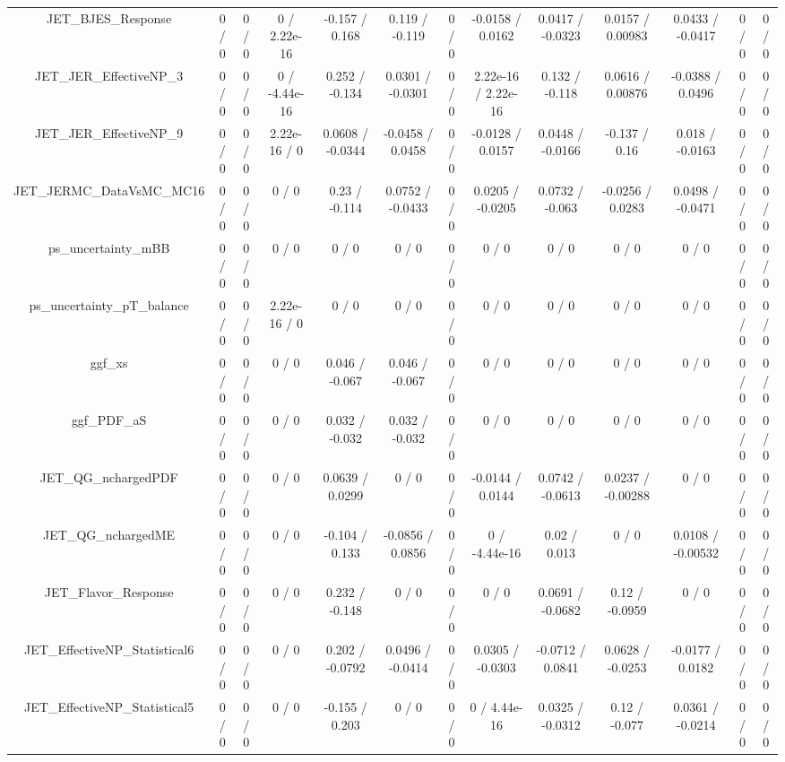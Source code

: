 \documentclass[10pt]{article}
\begin{document}
\begin{table}[htbp]
\begin{center}
\begin{tabular}{|c|c|c|c|c|c|c|c|c|c|c|c|c|}
  JET_BJES_Response & 0 / 0 & 0 / 0 & 0 / 2.22e-16 & -0.157 / 0.168 & 0.119 / -0.119 & 0 / 0 & -0.0158 / 0.0162 & 0.0417 / -0.0323 & 0.0157 / 0.00983 & 0.0433 / -0.0417 & 0 / 0 & 0 / 0 \\ 
  JET_JER_EffectiveNP_3 & 0 / 0 & 0 / 0 & 0 / -4.44e-16 & 0.252 / -0.134 & 0.0301 / -0.0301 & 0 / 0 & 2.22e-16 / 2.22e-16 & 0.132 / -0.118 & 0.0616 / 0.00876 & -0.0388 / 0.0496 & 0 / 0 & 0 / 0 \\ 
  JET_JER_EffectiveNP_9 & 0 / 0 & 0 / 0 & 2.22e-16 / 0 & 0.0608 / -0.0344 & -0.0458 / 0.0458 & 0 / 0 & -0.0128 / 0.0157 & 0.0448 / -0.0166 & -0.137 / 0.16 & 0.018 / -0.0163 & 0 / 0 & 0 / 0 \\ 
  JET_JERMC_DataVsMC_MC16 & 0 / 0 & 0 / 0 & 0 / 0 & 0.23 / -0.114 & 0.0752 / -0.0433 & 0 / 0 & 0.0205 / -0.0205 & 0.0732 / -0.063 & -0.0256 / 0.0283 & 0.0498 / -0.0471 & 0 / 0 & 0 / 0 \\ 
  ps_uncertainty_mBB & 0 / 0 & 0 / 0 & 0 / 0 & 0 / 0 & 0 / 0 & 0 / 0 & 0 / 0 & 0 / 0 & 0 / 0 & 0 / 0 & 0 / 0 & 0 / 0 \\ 
  ps_uncertainty_pT_balance & 0 / 0 & 0 / 0 & 2.22e-16 / 0 & 0 / 0 & 0 / 0 & 0 / 0 & 0 / 0 & 0 / 0 & 0 / 0 & 0 / 0 & 0 / 0 & 0 / 0 \\ 
  ggf_xs & 0 / 0 & 0 / 0 & 0 / 0 & 0.046 / -0.067 & 0.046 / -0.067 & 0 / 0 & 0 / 0 & 0 / 0 & 0 / 0 & 0 / 0 & 0 / 0 & 0 / 0 \\ 
  ggf_PDF_aS & 0 / 0 & 0 / 0 & 0 / 0 & 0.032 / -0.032 & 0.032 / -0.032 & 0 / 0 & 0 / 0 & 0 / 0 & 0 / 0 & 0 / 0 & 0 / 0 & 0 / 0 \\ 
  JET_QG_nchargedPDF & 0 / 0 & 0 / 0 & 0 / 0 & 0.0639 / 0.0299 & 0 / 0 & 0 / 0 & -0.0144 / 0.0144 & 0.0742 / -0.0613 & 0.0237 / -0.00288 & 0 / 0 & 0 / 0 & 0 / 0 \\ 
  JET_QG_nchargedME & 0 / 0 & 0 / 0 & 0 / 0 & -0.104 / 0.133 & -0.0856 / 0.0856 & 0 / 0 & 0 / -4.44e-16 & 0.02 / 0.013 & 0 / 0 & 0.0108 / -0.00532 & 0 / 0 & 0 / 0 \\ 
  JET_Flavor_Response & 0 / 0 & 0 / 0 & 0 / 0 & 0.232 / -0.148 & 0 / 0 & 0 / 0 & 0 / 0 & 0.0691 / -0.0682 & 0.12 / -0.0959 & 0 / 0 & 0 / 0 & 0 / 0 \\ 
  JET_EffectiveNP_Statistical6 & 0 / 0 & 0 / 0 & 0 / 0 & 0.202 / -0.0792 & 0.0496 / -0.0414 & 0 / 0 & 0.0305 / -0.0303 & -0.0712 / 0.0841 & 0.0628 / -0.0253 & -0.0177 / 0.0182 & 0 / 0 & 0 / 0 \\ 
  JET_EffectiveNP_Statistical5 & 0 / 0 & 0 / 0 & 0 / 0 & -0.155 / 0.203 & 0 / 0 & 0 / 0 & 0 / 4.44e-16 & 0.0325 / -0.0312 & 0.12 / -0.077 & 0.0361 / -0.0214 & 0 / 0 & 0 / 0 \\ 

\end{tabular}
\end{center}
\end{table}
\end{document}
